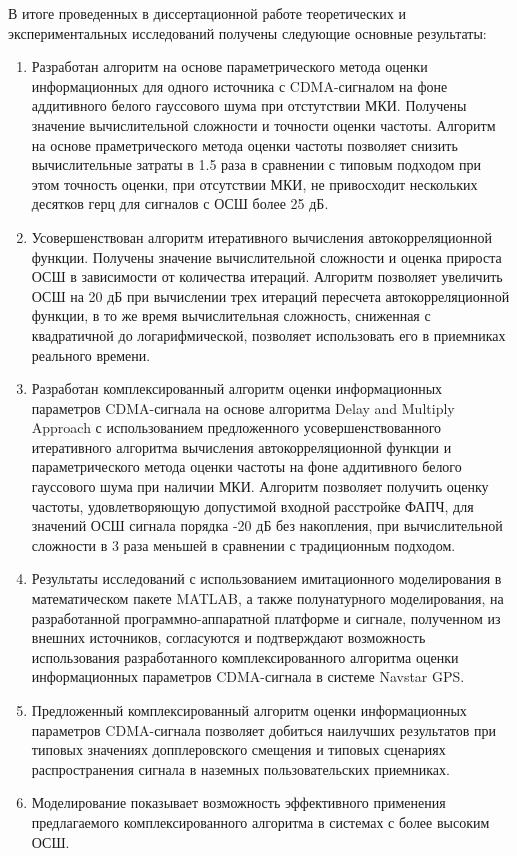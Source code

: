 В итоге проведенных в диссертационной работе теоретических и экспериментальных исследований получены следующие основные результаты:
\begin{enumerate}
	\item Разработан алгоритм на основе параметрического метода оценки информационных для одного источника с CDMA-сигналом на фоне аддитивного белого гауссового шума при отстутствии МКИ.
		Получены значение вычислительной сложности и точности оценки частоты. Алгоритм на основе праметрического метода оценки частоты позволяет снизить вычислительные
		затраты в 1.5 раза в сравнении с типовым подходом при этом точность оценки, при отсутствии МКИ, не привосходит нескольких десятков герц для сигналов
		с ОСШ более 25 дБ.
	\item Усовершенствован алгоритм итеративного вычисления автокорреляционной функции. Получены значение вычислительной сложности и оценка
		прироста ОСШ в зависимости от количества итераций. Алгоритм позволяет увеличить ОСШ на 20 дБ при вычислении трех итераций
		пересчета автокорреляционной функции, в то же время вычислительная сложность, сниженная с квадратичной до логарифмической,
		позволяет использовать его в приемниках реального времени.
	\item Разработан комплексированный алгоритм оценки информационных параметров CDMA-сигнала на основе алгоритма Delay and Multiply Approach с использованием
		предложенного усовершенствованного итеративного алгоритма вычисления автокорреляционной функции и параметрического
		метода оценки частоты на фоне аддитивного белого гауссового шума при наличии МКИ. Алгоритм позволяет получить оценку частоты, удовлетворяющую
		допустимой входной расстройке ФАПЧ, для значений ОСШ сигнала порядка -20 дБ без накопления, при вычислительной сложности в 3 раза меньшей в сравнении с традиционным подходом.
	\item Результаты исследований с использованием имитационного моделирования в математическом пакете MATLAB, а также полунатурного моделирования,
		на разработанной программно-аппаратной платформе и сигнале, полученном из внешних источников, согласуются и подтверждают возможность
		использования разработанного комплексированного алгоритма оценки информационных параметров CDMA-сигнала в системе Navstar GPS.
	\item Предложенный комплексированный алгоритм оценки информационных параметров CDMA-сигнала позволяет добиться наилучших результатов при
		типовых значениях допплеровского смещения и типовых сценариях распространения сигнала в наземных пользовательских приемниках.
	\item Моделирование показывает возможность эффективного применения предлагаемого комплексированного алгоритма в системах с более высоким ОСШ.
\end{enumerate}


\clearpage
